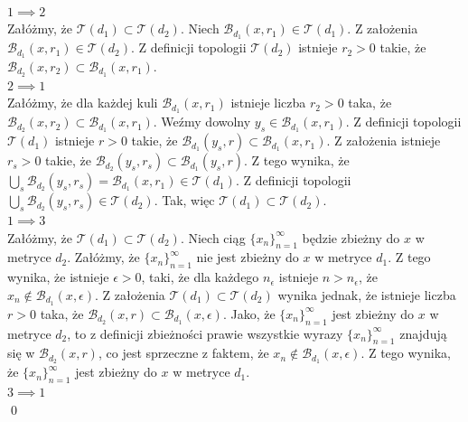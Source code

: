 \documentclass{article}
\theoremstyle{definition}%
\theoremstyle{theorem}
\renewenvironment{proof}{{\bfseries Rozwiązanie \\}}{\qed}
\begin{document}
		\begin{proof}
		\\	$1\implies2$\\
		Załóżmy, że $\mathcal{T}(d_1)\subset\mathcal{T}(d_2)$. Niech $\mathcal{B}_{d_1}(x,r_1)\in\mathcal{T}(d_1)$. Z założenia $\mathcal{B}_{d_1}(x,r_1)\in\mathcal{T}(d_2)$. Z definicji topologii $\mathcal{T}(d_2)$ istnieje $r_2>0$ takie, że\\
		$\mathcal{B}_{d_2}(x,r_2)\subset\mathcal{B}_{d_1}(x,r_1)$.\\
		$2\implies1$\\
		Załóżmy, że  dla każdej kuli $\mathcal{B}_{d_1}(x,r_1)$ istnieje liczba $r_2>0$ taka, że\\ $\mathcal{B}_{d_2}(x,r_2)\subset\mathcal{B}_{d_1}(x,r_1)$. Weźmy dowolny $y_s\in\mathcal{B}_{d_1}(x,r_1)$. Z definicji topologii $\mathcal{T}(d_1)$ istnieje $r>0$ takie, że $\mathcal{B}_{d_1}(y_s,r)\subset\mathcal{B}_{d_1}(x,r_1)$. Z założenia istnieje $r_s>0$ takie, że $\mathcal{B}_{d_2}(y_s,r_s)\subset\mathcal{B}_{d_1}(y_s,r)$. Z tego wynika, że $\bigcup_s \mathcal{B}_{d_2}(y_s,r_s) = \mathcal{B}_{d_1}(x,r_1)\in\mathcal{T}(d_1)$. Z definicji topologii $\bigcup_s \mathcal{B}_{d_2}(y_s,r_s)\in\mathcal{T}(d_2)$. Tak, więc $\mathcal{T}(d_1)\subset\mathcal{T}(d_2)$.\\
		$1\implies3$\\
		Załóżmy, że $\mathcal{T}(d_1)\subset\mathcal{T}(d_2)$. Niech ciąg $\{x_n\}_{n=1}^\infty$ będzie zbieżny do $x$ w metryce $d_2$. Załóżmy, że $\{x_n\}_{n=1}^\infty$ nie jest zbieżny do $x$ w metryce $d_1$. Z tego wynika, że istnieje $\epsilon>0$, taki, że dla każdego $n_{\epsilon}$ istnieje $n>n_{\epsilon}$, że $x_n\not\in\mathcal{B}_{d_1}(x,\epsilon)$. Z założenia $\mathcal{T}(d_1)\subset\mathcal{T}(d_2)$ wynika jednak, że istnieje liczba $r>0$ taka, że $\mathcal{B}_{d_2}(x,r)\subset\mathcal{B}_{d_1}(x,\epsilon)$. Jako, że $\{x_n\}_{n=1}^\infty$ jest zbieżny do $x$ w metryce $d_2$, to z definicji zbieżności prawie wszystkie wyrazy $\{x_n\}_{n=1}^\infty$ znajdują się w $\mathcal{B}_{d_2}(x,r)$, co jest sprzeczne z faktem, że $x_n\not\in\mathcal{B}_{d_1}(x,\epsilon)$. Z tego wynika, że $\{x_n\}_{n=1}^\infty$ jest zbieżny do $x$ w metryce $d_1$.\\
		$3\implies1$\\

\end{proof}
\end{document}
